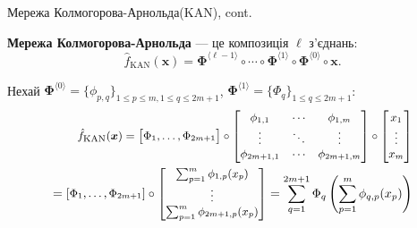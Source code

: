 \documentclass{zkdl-presentation-template}
\begin{document}
    \begin{frame}{Мережа Колмогорова-Арнольда(KAN), cont.}
        \begin{definition}
            \textbf{Мережа Колмогорова-Арнольда} --- це композиція $\ell$ з'єднань:
            \begin{equation*}
                \hat{f}_{\text{KAN}}(\boldsymbol{x}) = \boldsymbol{\Phi}^{\langle \ell-1 \rangle} \circ \cdots \circ \boldsymbol{\Phi}^{\langle 1 \rangle} \circ \boldsymbol{\Phi}^{\langle 0 \rangle} \circ \boldsymbol{x}.
            \end{equation*}
        \end{definition}

        \pause\begin{example}
            Нехай $\boldsymbol{\Phi}^{\langle 0 \rangle} = \{\phi_{p,q}\}_{1 \leq p \leq m, 1 \leq q \leq 2m+1}$, $\boldsymbol{\Phi}^{\langle 1 \rangle} = \{\Phi_q\}_{1 \leq q \leq 2m+1}$:
            \begin{align*}
                \small
                \hat{f}_{\text{KAN}}(\boldsymbol{x}) = \begin{bmatrix}
                    \Phi_1, \dots, \Phi_{2m+1}
                \end{bmatrix} \circ \begin{bmatrix}
                    \phi_{1,1} & \cdots & \phi_{1,m} \\
                    \vdots & \ddots & \vdots \\
                    \phi_{2m+1,1} & \cdots & \phi_{2m+1,m}
                \end{bmatrix} \circ \begin{bmatrix}
                    x_1 \\
                    \vdots \\
                    x_m
                \end{bmatrix} \\
                = \small\begin{bmatrix}
                    \Phi_1, \dots, \Phi_{2m+1}
                \end{bmatrix} \circ \begin{bmatrix}
                    \sum_{p=1}^m \phi_{1,p}(x_p) \\
                    \vdots \\
                    \sum_{p=1}^m \phi_{2m+1,p}(x_p)
                \end{bmatrix} = \sum_{q=1}^{2m+1}\Phi_q\left(\sum_{p=1}^m \phi_{q,p}(x_p)\right)
            \end{align*}
        \end{example}
    \end{frame}
\end{document}
